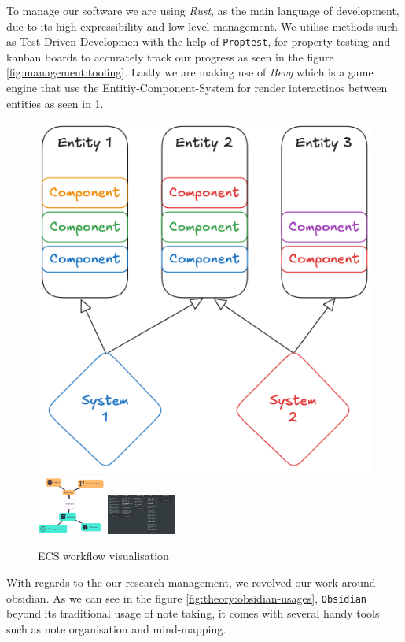 To manage our software we are using \textit{Rust},
as the main language of development, due to its high expressibility and low level management.
We utilise methods such as Test-Driven-Developmen with the help of \texttt{Proptest},
for property testing and kanban boards to accurately track our progress as seen
in the figure \ref{fig:management:tooling}. Lastly we are making use of 
\textit{Bevy} which is a game engine that use the Entitiy-Component-System
for render interactinos between entities as seen in \ref{fig:soft:ecs-workflow}.


\begin{figure}[h!]
    \centering
    \includegraphics[width=0.2\linewidth]{assets/ECS-visualisatoin.png}
    \includegraphics[width=0.2\textwidth]{assets/research-visualisation.png}
    \includegraphics[width=0.2\textwidth]{assets/kanban-board.png}
    \caption{ECS workflow visualisation}
    \label{fig:soft:ecs-workflow}
\end{figure}

With regards to the our research management, we revolved our work around obsidian. As we can see in the figure \ref{fig:theory:obsidian-usages}, 
\texttt{Obsidian} beyond its traditional usage of note taking, it comes
with several handy tools such as note organisation and mind-mapping.



